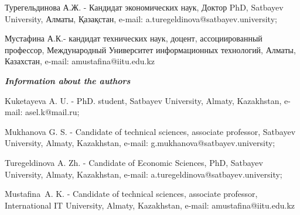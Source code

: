 Турегельдинова А.Ж. - Кандидат экономических наук, Доктор PhD,
Satbayev University, Алматы, Қазақстан, e-mail:
a.turegeldinova@satbayev.university;

Мустафина А.К.- кандидат технических наук, доцент, ассоциированный
профессор, Международный Университет информационных технологий, Алматы,
Казахстан, e-mail: amustafina@iitu.edu.kz

\emph{{\bfseries Information about the authors}}

Kuketayeva A. U. - PhD. student, Satbayev University, Almaty,
Kazakhstan, e-mail: asel.k@mail.ru;

Mukhanova G. S. - Candidate of technical sciences, associate professor,
Satbayev University, Almaty, Kazakhstan, e-mail:
g.mukhanova@satbayev.university;

Turegeldinova A. Zh. - Candidate of Economic Sciences, PhD,
Satbayev University, Almaty, Kazakhstan, e-mail:
a.turegeldinova@satbayev.university;

Mustafina~A. K. - Candidate of technical sciences, associate
professor, International IT University, Almaty, Kazakhstan, e-mail:
amustafina@iitu.edu.kz\